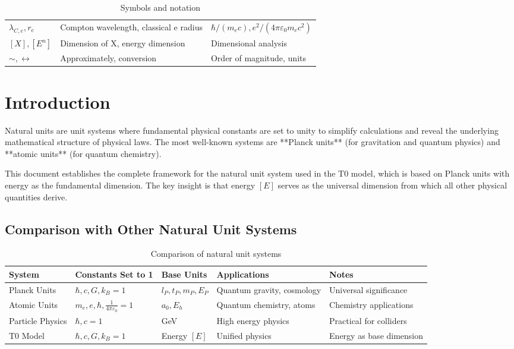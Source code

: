 \documentclass[11pt,a4paper]{article}
\begin{document}
{\begin{table}[htbp]
\begin{adjustbox}{width=0.98\textwidth}
\begin{tabular}{lll}
					$\lambda_{C,e}, r_e$ & Compton wavelength, classical e radius & $\hbar/(m_e c), e^2/(4\pi\varepsilon_0 m_e c^2)$ \\
					$[X], [E^n]$ & Dimension of X, energy dimension & Dimensional analysis \\
					$\sim, \leftrightarrow$ & Approximately, conversion & Order of magnitude, units \\
					\bottomrule
				\end{tabular}
			\end{adjustbox}
			\caption{Symbols and notation}
			\label{tab:symbols}
		\end{table}
	}
	
	\newpage
	
	\section{Introduction}
	
	Natural units are unit systems where fundamental physical constants are set to unity to simplify calculations and reveal the underlying mathematical structure of physical laws. The most well-known systems are **Planck units** (for gravitation and quantum physics) and **atomic units** (for quantum chemistry).
	
	This document establishes the complete framework for the natural unit system used in the T0 model, which is based on Planck units with energy as the fundamental dimension. The key insight is that energy $[E]$ serves as the universal dimension from which all other physical quantities derive.
	
	\subsection{Comparison with Other Natural Unit Systems}
	
	\begin{table}[htbp]
		\centering
		\begin{adjustbox}{width=0.95\textwidth}
			\begin{tabular}{lllll}
				\toprule
				\textbf{System} & \textbf{Constants Set to 1} & \textbf{Base Units} & \textbf{Applications} & \textbf{Notes} \\
				\midrule
				Planck Units & $\hbar, c, G, k_B = 1$ & $l_P, t_P, m_P, E_P$ & Quantum gravity, cosmology & Universal significance \\
				Atomic Units & $m_e, e, \hbar, \frac{1}{4\pi\varepsilon_0} = 1$ & $a_0, E_h$ & Quantum chemistry, atoms & Chemistry applications \\
				Particle Physics & $\hbar, c = 1$ & GeV & High energy physics & Practical for colliders \\
				T0 Model & $\hbar, c, G, k_B = 1$ & Energy $[E]$ & Unified physics & Energy as base dimension \\
				\bottomrule
			\end{tabular}
		\end{adjustbox}
		\caption{Comparison of natural unit systems}
		\label{tab:unit_systems}
	\end{table}
	
\end{document}

